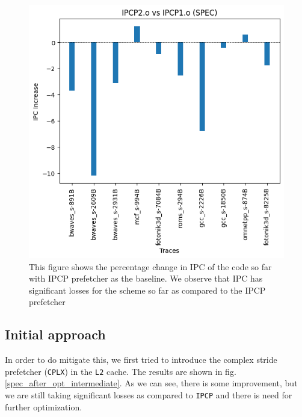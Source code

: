 \documentclass[conference]{IEEEtran}
\begin{document}
\begin{figure}
\includegraphics[scale=0.5]{Images/Bingo/without_cplx_spec.png}
\caption{This figure shows the percentage change in IPC of the code so far with IPCP prefetcher as the baseline. We observe that IPC has significant losses for the scheme so far as compared to the IPCP prefetcher}
\label{spec_curr}
\end{figure}

\subsection{Initial approach}
In order to do mitigate this, we first tried to introduce the complex stride prefetcher (\verb|CPLX|) in the \verb|L2| cache. The results are shown in fig. \ref{spec_after_opt_intermediate}. As we can see, there is some improvement, but we are still taking significant losses as compared to \verb|IPCP| and there is need for further optimization.
\end{document}
